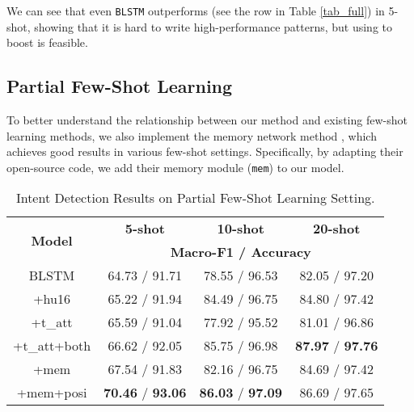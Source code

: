 
We can see that even \texttt{BLSTM} outperforms \RE (see the \RE row in Table \ref{tab_full}) in 5-shot, showing that it is hard to write high-performance \RE patterns, but using \RE to boost \NN is feasible.


\subsection{Partial Few-Shot Learning}
To better understand the relationship between our method and existing few-shot learning methods, we also implement the memory network method \cite{kaiser2017learning}, which achieves good results in various few-shot settings. Specifically, by adapting their open-source code, we add their memory module (\texttt{mem}) to our \BLSTM model.

\begin{table}
\setlength{\tabcolsep}{0.23em}
\centering
\small{
\begin{tabular}{|c|c|c|c|}

\hline
\multirow{2}{*}{\textbf{Model}}  & \multicolumn{1}{|c|}{\textbf{5-shot}} & \multicolumn{1}{|c|}{\textbf{10-shot}} & \multicolumn{1}{|c|}{\textbf{20-shot}}  \\
\cline{2-4}
 & \multicolumn{3}{|c|}{\textbf{Macro-F1 / Accuracy}}   \\
\hline
BLSTM & 64.73 / 91.71 & 78.55 / 96.53 & 82.05 / 97.20 \\
\hline
+hu16 & 65.22 / 91.94 & 84.49 / 96.75 & 84.80 / 97.42 \\
\hline
+t\_att & 65.59 / 91.04 & 77.92 / 95.52 & 81.01 / 96.86 \\
\hline
+t\_att+both & 66.62 / 92.05 & 85.75 / 96.98 & \textbf{87.97} / \textbf{97.76} \\
\hline
+mem & 67.54 / 91.83 & 82.16 / 96.75 & 84.69 / 97.42 \\
\hline
+mem+posi & \textbf{70.46} / \textbf{93.06} & \textbf{86.03} / \textbf{97.09} & 86.69 / 97.65 \\
\hline

\end{tabular}
}
\caption{Intent Detection Results on Partial Few-Shot Learning Setting.}
\label{tab_intent_few_fill}
\end{table}

